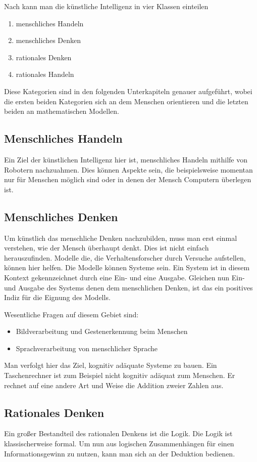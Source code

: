 Nach \cite{Russel10} kann man die künstliche Intelligenz in vier Klassen einteilen
\begin{enumerate}
\item menschliches Handeln
\item menschliches Denken
\item rationales Denken
\item rationales Handeln
\end{enumerate}
Diese Kategorien sind in den folgenden Unterkapiteln genauer aufgeführt, wobei die ersten beiden Kategorien sich an dem Menschen orientieren und die letzten beiden an mathematischen Modellen. 

\subsection{Menschliches Handeln}
Ein Ziel der künstlichen Intelligenz hier ist, menschliches Handeln mithilfe von Robotern nachzuahmen. Dies können Aspekte sein, die beispielsweise momentan nur für Menschen möglich sind oder in denen der Mensch Computern überlegen ist.    

\subsection{Menschliches Denken}
Um künstlich das menschliche Denken nachzubilden, muss  man erst einmal verstehen, wie der Mensch überhaupt denkt. Dies ist nicht einfach herauszufinden. Modelle die, die Verhaltensforscher durch Versuche aufstellen,  können hier helfen. Die Modelle können Systeme sein. Ein System ist in diesem Kontext gekennzeichnet durch eine Ein- und eine Ausgabe. Gleichen nun Ein- und Ausgabe des Systems denen dem menschlichen Denken, ist das ein positives Indiz für die Eignung des Modells.

Wesentliche Fragen auf diesem Gebiet sind:
\begin{itemize}
\item Bildverarbeitung und Gestenerkennung beim Menschen
\item Sprachverarbeitung von menschlicher Sprache
\end{itemize}    

Man verfolgt hier das Ziel, kognitiv adäquate Systeme zu bauen. Ein Taschenrechner ist zum Beispiel nicht kognitiv adäquat zum Menschen. Er rechnet auf eine andere Art und Weise die Addition zweier Zahlen aus.
\subsection{Rationales Denken}
Ein großer Bestandteil des rationalen Denkens ist die Logik. Die Logik ist klassischerweise formal. Um nun aus logischen Zusammenhängen für einen Informationsgewinn zu nutzen, kann man sich an der Deduktion bedienen. 

